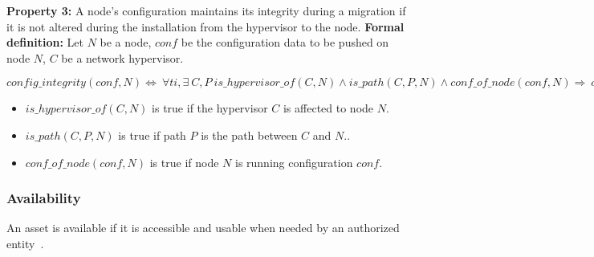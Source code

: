 

\textbf{Property 3:} A node's configuration maintains its integrity during a migration if it is not altered during the installation from the hypervisor to the node.
\newline \textbf{Formal definition:} Let $N$ be a node, $conf$ be the configuration data to be pushed on node $N$, $C$ be a network hypervisor.
\newline

\begin{myformula}
$config\_integrity(conf,N) \Leftrightarrow~\forall ti,\exists~C,P 
~is\_hypervisor\_of(C,N) \wedge is\_path(C,P,N) \wedge  conf\_of\_node(conf,N) \Rightarrow
~d\_integrity(conf,ti)
$
\end{myformula}

\begin{itemize}
\item $is\_hypervisor\_of(C,N)$ is true if the hypervisor $C$ is affected to node $N$.  
\item $is\_path(C,P,N)$ is true if path $P$ is the path between $C$ and $N$..
\item $conf\_of\_node(conf, N)$ is true if node $N$ is running configuration $conf$.
\end{itemize}

\subsubsection{Availability}
\label{sec:prop-avail}
An asset is available if it is accessible and usable when
needed by an authorized entity~\cite{ISO/IEC270012013}.

